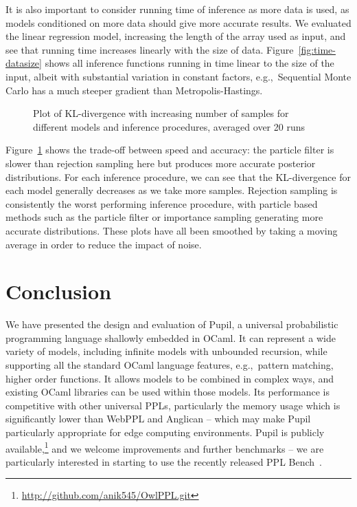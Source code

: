 \documentclass[sigconf,timestamp]{acmart}
\newcommand{\pupil}{Pupil\xspace}
\begin{document}
It is also important to consider running time of inference as more data is used, as  models conditioned on more data should  give more accurate results. We evaluated  the linear regression model, increasing the length of the array used as input, and see that running time increases linearly with the size of data. Figure~\ref{fig:time-datasize} shows all inference functions running in time linear to the size of the input, albeit with substantial variation in constant factors, e.g.,~Sequential Monte Carlo has a much steeper gradient than Metropolis-Hastings.

\begin{figure}
  \centering
  
  \caption{\label{fig:kl}
    Plot of KL-divergence with increasing number of samples for different models and inference procedures, averaged over 20 runs
  }
\end{figure}

Figure~\ref{fig:kl} shows the trade-off between speed and accuracy: the particle filter is slower than rejection sampling here but produces more accurate posterior distributions. For each inference procedure, we can see that the KL-divergence for each model generally decreases as we take more samples. Rejection sampling is consistently the worst performing inference procedure, with particle based methods such as the particle filter or importance sampling generating more accurate distributions. These plots have all been smoothed by taking a moving average in order to reduce the impact of noise.

\section{Conclusion}
\label{s:conclusion}

We have presented the design and evaluation of \pupil, a universal probabilistic programming language shallowly embedded in OCaml. It can represent a wide variety of models, including infinite models with unbounded recursion, while supporting all the standard OCaml language features, e.g.,~pattern matching, higher order functions. It allows models to be combined in complex ways, and existing OCaml libraries can be used within those models. Its performance is competitive with other universal PPLs, particularly the memory usage which is significantly lower than WebPPL and Anglican -- which may make \pupil particularly appropriate for edge computing environments. \pupil is publicly available,\footnote{\url{http://github.com/anik545/OwlPPL.git}} and we welcome improvements and further benchmarks -- we are particularly interested in starting to use the recently released PPL Bench~\cite{pplbench}.


{
  \clearpage
  
  
}
\end{document}
